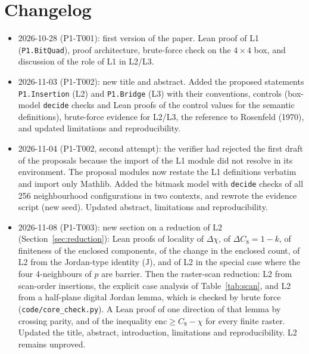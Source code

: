 \documentclass[11pt]{article}
\theoremstyle{definition}
\theoremstyle{remark}
\begin{document}
\section*{Changelog}
\begin{itemize}
\item 2026-10-28 (P1-T001): first version of the paper. Lean proof of L1
  (\texttt{P1.BitQuad}), proof architecture, brute-force check on the
  $4\times4$ box, and discussion of the role of L1 in L2/L3.
\item 2026-11-03 (P1-T002): new title and abstract. Added the proposed
  statements \texttt{P1.Insertion} (L2) and \texttt{P1.Bridge} (L3) with their
  conventions, controls (box-model \texttt{decide} checks and Lean proofs of the
  control values for the semantic definitions), brute-force evidence for L2/L3,
  the reference to Rosenfeld (1970), and updated limitations and reproducibility.
\item 2026-11-04 (P1-T002, second attempt): the verifier had rejected the first
  draft of the proposals because the import of the L1 module did not resolve in its
  environment. The proposal modules now restate the L1 definitions verbatim and
  import only Mathlib. Added the bitmask model with \texttt{decide} checks of all
  256 neighbourhood configurations in two contexts, and rewrote the evidence
  script (new seed). Updated abstract, limitations and reproducibility.
\item 2026-11-08 (P1-T003): new section on a reduction of L2
  (Section~\ref{sec:reduction}): Lean proofs of locality of $\Delta\chi$,
  of $\Delta C_8 = 1-k$, of finiteness of the enclosed components, of the change
  in the enclosed count, of L2 from the Jordan-type identity (J), and of L2 in
  the special case where the four 4-neighbours of $p$ are barrier. Then the
  raster-scan reduction: L2 from scan-order insertions, the explicit case analysis
  of Table~\ref{tab:scan}, and L2 from a half-plane digital Jordan lemma, which is
  checked by brute force (\texttt{code/core\_check.py}). A Lean proof of one
  direction of that lemma by crossing parity, and of the inequality
  $\mathrm{enc}\ge C_8-\chi$ for every finite raster. Updated the title, abstract, introduction,
  limitations and reproducibility. L2 remains unproved.
\end{itemize}



\end{document}
